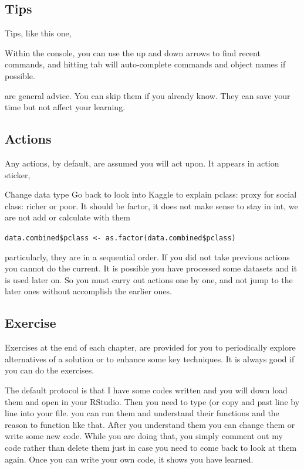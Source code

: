 \documentclass[
]{book}
\makeatletter
\newenvironment{kframe}{%
\medskip{}
\setlength{\fboxsep}{.8em}
 \def\at@end@of@kframe{}%
 \ifinner\ifhmode%
  \def\at@end@of@kframe{\end{minipage}}%
  \begin{minipage}{\columnwidth}%
 \fi\fi%
 \def\FrameCommand##1{\hskip\@totalleftmargin \hskip-\fboxsep
 \colorbox{shadecolor}{##1}\hskip-\fboxsep
     \hskip-\linewidth \hskip-\@totalleftmargin \hskip\columnwidth}%
 \MakeFramed {\advance\hsize-\width
   \@totalleftmargin\z@ \linewidth\hsize
   \@setminipage}}%
 {\par\unskip\endMakeFramed%
 \at@end@of@kframe}
\newenvironment{rmdblock}[1]
  {
  \begin{itemize}
  \renewcommand{\labelitemi}{
    \raisebox{-.7\height}[0pt][0pt]{
      {\setkeys{Gin}{width=3em,keepaspectratio}\texttt{[image: images/\#1]}}
    }
  }
  \setlength{\fboxsep}{1em}
  \begin{kframe}
  \item
  }
  {
  \end{kframe}
  \end{itemize}
  }
\newenvironment{rmdtip}
  {\begin{rmdblock}{tip}}
  {\end{rmdblock}}
\makeatother
\begin{document}
\hypertarget{tips}{%
\subsection*{Tips}\label{tips}}


Tips, like this one,

\begin{rmdtip}
Within the console, you can use the up and down arrows to find recent commands, and hitting tab will auto-complete commands and object names if possible.
\end{rmdtip}

are general advice. You can skip them if you already know. They can save your time but not affect your learning.

\hypertarget{actions}{%
\subsection*{Actions}\label{actions}}


Any actions, by default, are assumed you will act upon. It appears in action sticker,

\begin{rmdact}
Change data type
Go back to look into Kaggle to explain pclass: proxy for social class: richer or poor. It should be factor, it does not make sense to stay in int, we are not add or calculate with them

\texttt{data.combined\$pclass\ \textless{}-\ as.factor(data.combined\$pclass)}
\end{rmdact}

particularly, they are in a sequential order. If you did not take previous actions you cannot do the current. It is possible you have processed some datasets and it is used later on. So you must carry out actions one by one, and not jump to the later ones without accomplish the earlier ones.

\hypertarget{exercise}{%
\subsection*{Exercise}\label{exercise}}


Exercises at the end of each chapter, are provided for you to periodically explore alternatives of a solution or to enhance some key techniques. It is always good if you can do the exercises.

The default protocol is that I have some codes written and you will down load them and open in your RStudio. Then you need to type (or copy and past line by line into your file. you can run them and understand their functions and the reason to function like that. After you understand them you can change them or write some new code. While you are doing that, you simply comment out my code rather than delete them just in case you need to come back to look at them again. Once you can write your own code, it shows you have learned.
\end{document}
